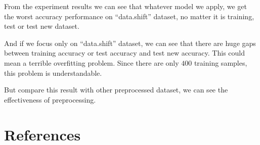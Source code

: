 \documentclass[a4paper]{article}
\begin{document}
From the experiment results we can see that whatever model we apply, we get the worst accuracy performance on ``data.shift'' dataset, no matter it is training, test or test new dataset.

And if we focus only on ``data.shift'' dataset, we can see that there are huge gaps between training accuracy or test accuracy and test new accuracy. This could mean a terrible overfitting problem. Since there are only $400$ training samples, this problem is understandable.

But compare this result with other preprocessed dataset, we can see the effectiveness of preprocessing.

\section{References}



\end{document}
